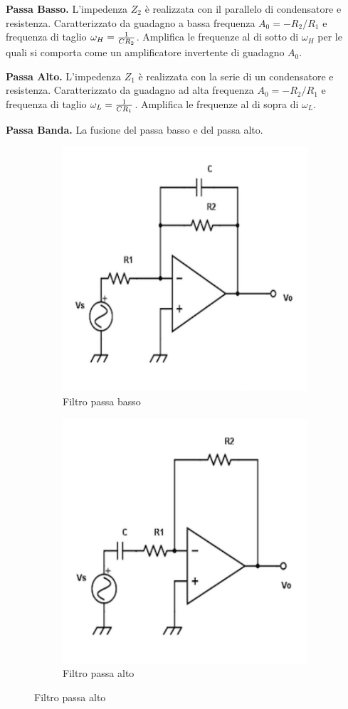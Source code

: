\documentclass[a4paper,portrait,12pt]{article}
\theoremstyle{definition}
\begin{document}
\textbf{Passa Basso.} L'impedenza $Z_2$ è realizzata con il parallelo di condensatore e resistenza. 
Caratterizzato da guadagno a bassa frequenza $A_0 = -R_2 / R_1$ e frequenza di taglio $\omega_H = {1 
\over CR_2}$. Amplifica le frequenze al di sotto di $\omega_H$ per le quali si comporta come un amplificatore 
invertente di guadagno $A_0$.
\bigskip

\textbf{Passa Alto.} L'impedenza $Z_1$ è realizzata con la serie di un condensatore e resistenza. 
Caratterizzato da guadagno ad alta frequenza $A_0 = -R_2/R_1$ e frequenza di taglio $\omega_L = {1 \over 
CR_1}$. Amplifica le frequenze al di sopra di $\omega_L$.
\bigskip

\textbf{Passa Banda.} La fusione del passa basso e del passa alto.
\bigskip

\begin{figure}[H]
\begin{subfigure}{.5\textwidth}
\centering
\includegraphics[width=.5\linewidth]{img/passabasso.pdf}
\caption{Filtro passa basso}
\label{fig:passabasso}
\end{subfigure}
\begin{subfigure}{.5\textwidth}
\centering
\includegraphics[width=.5\linewidth]{img/passaalto.pdf}
\caption{Filtro passa alto}
\label{fig:passaalto}

\end{subfigure}
\end{figure}
\end{document}
